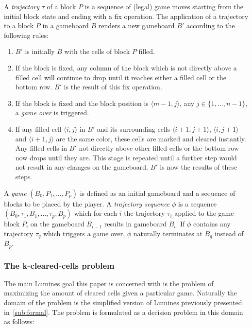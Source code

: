 \begin{description}[style=unboxed, leftmargin=0cm,labelsep=1em]
\item[Playing the game] A \textit{trajectory} $\tau$ of a block $P$ is a sequence of (legal) game moves starting from the initial block state and ending with a fix operation. The application of a trajectory to a block $P$ in a gameboard $B$ renders a new gameboard $B'$ according to the following rules:

    \begin{enumerate}
            \item $B'$ is initially $B$ with the cells of block $P$ filled.
            \item If the block is fixed, any column of the block which is not directly above a filled cell will continue to drop until it reaches either a filled cell or the bottom row. $B'$ is the result of this fix operation.
            \item If the block is fixed and the block position is $\langle m-1, j\rangle$, any $j \in \{1, \ldots, n-1\}$, a \textit{game over} is triggered.
            \item If any filled cell $\langle i,j \rangle$ in $B'$ and its surrounding cells $\langle i+1,j+1 \rangle$, $\langle i, j+1 \rangle$ and $\langle i+1, j \rangle$ are the same color, these cells are marked and cleared instantly. Any filled cells in $B'$ not directly above other filled cells or the bottom row now drops until they are. This stage is repeated until a further step would not result in any changes on the gameboard. $B'$ is now the results of these steps.
    \end{enumerate}

    A \textit{game} $(B_0, P_1, \ldots, P_p)$ is defined as an initial gameboard and a sequence of blocks to be placed by the player. A \textit{trajectory sequence} $\phi$ is a sequence $(B_0, \tau_1, B_1, \ldots ,\tau_p, B_p)$ which for each $i$ the trajectory $\tau_i$ applied to the game block $P_i$ on the gameboard $B_{i-1}$ results in gameboard $B_i$. If $\phi$ contains any trajectory $\tau_q$ which triggers a game over, $\phi$ naturally terminates at $B_q$ instead of $B_p$.
    \end{description}

\subsubsection{The k-cleared-cells problem}
The main Lumines goal this paper is concerned with is the problem of maximizing the amount of cleared cells given a particular game. Naturally the domain of the problem is the simplified version of Lumines previously presented in~\ref{sub:formal}. The problem is formulated as a decision problem in this domain as follows:

